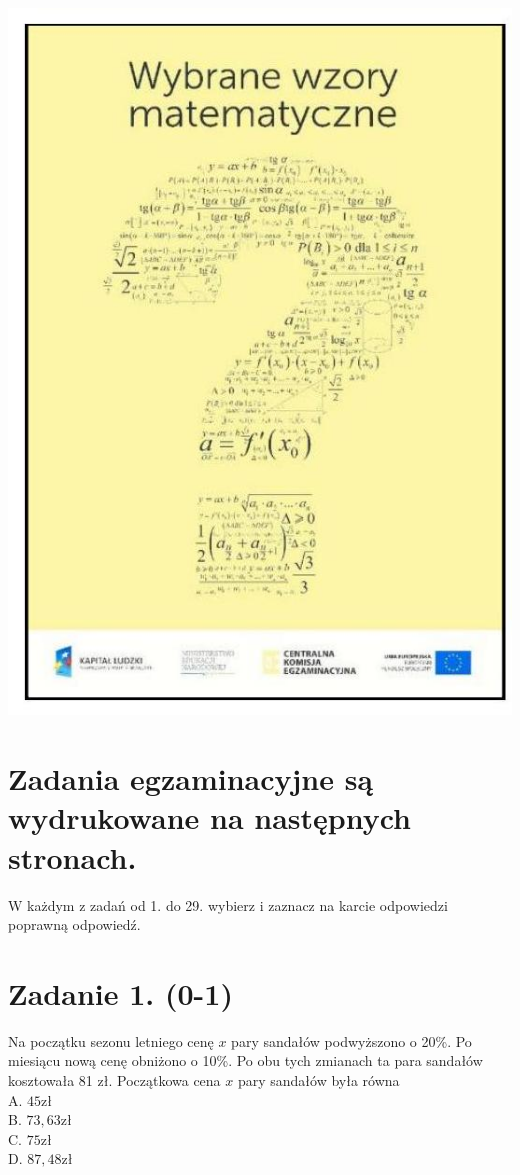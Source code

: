 \documentclass[10pt]{article}
\begin{document}
\begin{enumerate}
\includegraphics[max width=\textwidth, center]{2024_11_21_0a35d272448d5080a489g-02}
\end{enumerate}

\section*{Zadania egzaminacyjne są wydrukowane na następnych stronach.}
W każdym z zadań od 1. do 29. wybierz i zaznacz na karcie odpowiedzi poprawną odpowiedź.

\section*{Zadanie 1. (0-1)}
Na początku sezonu letniego cenę \(x\) pary sandałów podwyższono o 20\%. Po miesiącu nową cenę obniżono o 10\%. Po obu tych zmianach ta para sandałów kosztowała 81 zł. Początkowa cena \(x\) pary sandałów była równa\\
A. \(45 \mathrm{zł}\)\\
B. \(73,63 \mathrm{zł}\)\\
C. \(75 \mathrm{zł}\)\\
D. \(87,48 \mathrm{zł}\)
\end{document}
